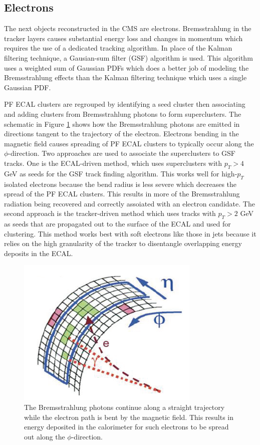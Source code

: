\subsection{Electrons}
The next objects reconstructed in the CMS are electrons.  Bremsstrahlung in the tracker layers causes substantial energy loss and changes in momentum which requires the use of a dedicated tracking algorithm.  In place of the Kalman filtering technique, a Gausian-sum filter (GSF) algorithm is used.  This algorithm uses a weighted sum of Gaussian PDFs which does a better job of modeling the Bremsstrahlung effects than the Kalman filtering technique which uses a single Gaussian PDF.  

PF ECAL clusters are regrouped by identifying a seed cluster then associating and adding clusters from Bremsstrahlung photons to form superclusters.  The schematic in Figure \ref{fig:electrontracking} shows how the Bremsstrahlung photons are emitted in directions tangent to the trajectory of the electron.  Electrons bending in the magnetic field causes spreading of PF ECAL clusters to typically occur along the $\phi$-direction.  Two approaches are used to associate the superclusters to GSF tracks.  One is the ECAL-driven method, which uses superclusters with $p_T > 4$ GeV as seeds for the GSF track finding algorithm.  This works well for high-$p_T$ isolated electrons because the bend radius is less severe which decreases the spread of the PF ECAL clusters. This results in more of the Bremsstrahlung radiation being recovered and correctly assoiated with an electron candidate.  The second approach is the tracker-driven method which uses tracks with $p_T > 2$ GeV as seeds that are propagated out to the surface of the ECAL and used for clustering.  This method works best with soft electrons like those in jets because it relies on the high granularity of the tracker to disentangle overlapping energy deposits in the ECAL. \cite{Electrontracking:2715343}

\begin{figure}[h]
	\centering
	\includegraphics[width=0.5\linewidth]{Figures/electrontracking}
	\caption{The Bremsstrahlung photons continue along a straight trajectory while the electron path is bent by the magnetic field.  This results in energy deposited in the calorimeter for such electrons to be spread out along the $\phi$-direction.}
	\label{fig:electrontracking}
\end{figure}

